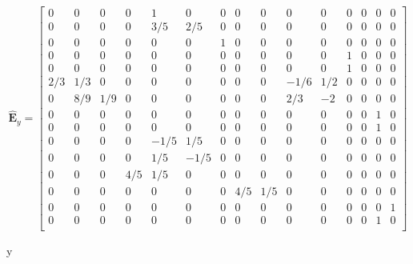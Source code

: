 \begin{equation}
	\hat{\bm{E}}_{y}=
	\begin{bmatrix}
	0 & 0 & 0 & 0 & 1 & 0 & 0 & 0 & 0 & 0 & 0 & 0 & 0 & 0 & 0 \\
	0 & 0 & 0 & 0 & 3/5 & 2/5 & 0 & 0 & 0 & 0 & 0 & 0 & 0 & 0 & 0 \\
	0 & 0 & 0 & 0 & 0 & 0 & 1 & 0 & 0 & 0 & 0 & 0 & 0 & 0 & 0 \\
	0 & 0 & 0 & 0 & 0 & 0 & 0 & 0 & 0 & 0 & 0 & 1 & 0 & 0 & 0 \\
	0 & 0 & 0 & 0 & 0 & 0 & 0 & 0 & 0 & 0 & 0 & 1 & 0 & 0 & 0 \\
	2/3 & 1/3 & 0 & 0 & 0 & 0 & 0 & 0 & 0 & -1/6 & 1/2 & 0 & 0 & 0 & 0 \\
	0 & 8/9 & 1/9 & 0 & 0 & 0 & 0 & 0 & 0 & 2/3 & -2 & 0 & 0 & 0 & 0 \\
	0 & 0 & 0 & 0 & 0 & 0 & 0 & 0 & 0 & 0 & 0 & 0 & 0 & 1 & 0 \\
	0 & 0 & 0 & 0 & 0 & 0 & 0 & 0 & 0 & 0 & 0 & 0 & 0 & 1 & 0 \\
	0 & 0 & 0 & 0 & -1/5 & 1/5 & 0 & 0 & 0 & 0 & 0 & 0 & 0 & 0 & 0 \\
	0 & 0 & 0 & 0 & 1/5 & -1/5 & 0 & 0 & 0 & 0 & 0 & 0 & 0 & 0 & 0 \\
	0 & 0 & 0 & 4/5 & 1/5 & 0 & 0 & 0 & 0 & 0 & 0 & 0 & 0 & 0 & 0 \\
	0 & 0 & 0 & 0 & 0 & 0 & 0 & 4/5 & 1/5 & 0 & 0 & 0 & 0 & 0 & 0 \\
	0 & 0 & 0 & 0 & 0 & 0 & 0 & 0 & 0 & 0 & 0 & 0 & 0 & 0 & 1 \\
	0 & 0 & 0 & 0 & 0 & 0 & 0 & 0 & 0 & 0 & 0 & 0 & 0 & 1 & 0 \\
	\end{bmatrix}
\end{equation} 

y 

